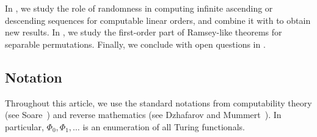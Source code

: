 \documentclass{article}
\numberwithin{theorem}{section}
\newcommand{\ludovic}[1]{\textcolor{blue}{#1}}
\newcommand{\ADS}[0]{\mathsf{ADS}}
\newcommand{\EM}[0]{\mathsf{EM}}
\newcommand{\RT}[0]{\mathsf{RT}}
\newcommand{\coRT}[0]{\mathsf{coRT}}
\newcommand{\SepRT}[0]{\mathsf{Sep}\mbox{-}\mathsf{RT}}
\begin{document}
In , we study the role of randomness in computing infinite ascending or descending sequences for computable linear orders, and combine it with  to obtain new results. In , we study the first-order part of Ramsey-like theorems for separable permutations. Finally, we conclude with open questions in .



\subsection{Notation}

Throughout this article, we use the standard notations from computability theory (see Soare~\cite{soare2016turing}) and reverse mathematics (see Dzhafarov and Mummert~\cite{dzhafarov2022reverse}).
In particular, $\Phi_0, \Phi_1, \dots$ is an enumeration of all Turing functionals.
\end{document}
